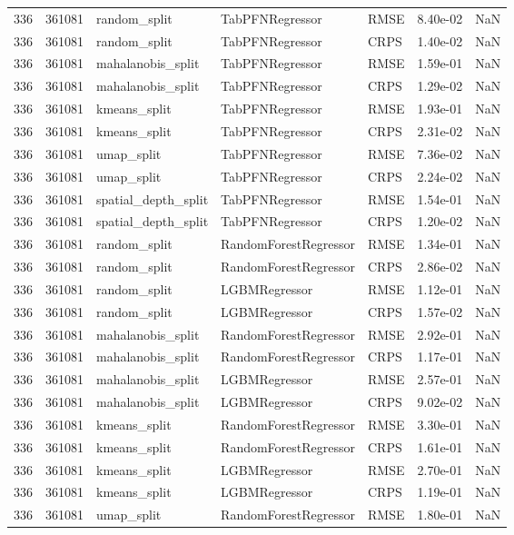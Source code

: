 \begin{tabular}{rrlllrr}
336 & 361081 & random\_split & TabPFNRegressor & RMSE & 8.40e-02 & NaN \\
336 & 361081 & random\_split & TabPFNRegressor & CRPS & 1.40e-02 & NaN \\
336 & 361081 & mahalanobis\_split & TabPFNRegressor & RMSE & 1.59e-01 & NaN \\
336 & 361081 & mahalanobis\_split & TabPFNRegressor & CRPS & 1.29e-02 & NaN \\
336 & 361081 & kmeans\_split & TabPFNRegressor & RMSE & 1.93e-01 & NaN \\
336 & 361081 & kmeans\_split & TabPFNRegressor & CRPS & 2.31e-02 & NaN \\
336 & 361081 & umap\_split & TabPFNRegressor & RMSE & 7.36e-02 & NaN \\
336 & 361081 & umap\_split & TabPFNRegressor & CRPS & 2.24e-02 & NaN \\
336 & 361081 & spatial\_depth\_split & TabPFNRegressor & RMSE & 1.54e-01 & NaN \\
336 & 361081 & spatial\_depth\_split & TabPFNRegressor & CRPS & 1.20e-02 & NaN \\
336 & 361081 & random\_split & RandomForestRegressor & RMSE & 1.34e-01 & NaN \\
336 & 361081 & random\_split & RandomForestRegressor & CRPS & 2.86e-02 & NaN \\
336 & 361081 & random\_split & LGBMRegressor & RMSE & 1.12e-01 & NaN \\
336 & 361081 & random\_split & LGBMRegressor & CRPS & 1.57e-02 & NaN \\
336 & 361081 & mahalanobis\_split & RandomForestRegressor & RMSE & 2.92e-01 & NaN \\
336 & 361081 & mahalanobis\_split & RandomForestRegressor & CRPS & 1.17e-01 & NaN \\
336 & 361081 & mahalanobis\_split & LGBMRegressor & RMSE & 2.57e-01 & NaN \\
336 & 361081 & mahalanobis\_split & LGBMRegressor & CRPS & 9.02e-02 & NaN \\
336 & 361081 & kmeans\_split & RandomForestRegressor & RMSE & 3.30e-01 & NaN \\
336 & 361081 & kmeans\_split & RandomForestRegressor & CRPS & 1.61e-01 & NaN \\
336 & 361081 & kmeans\_split & LGBMRegressor & RMSE & 2.70e-01 & NaN \\
336 & 361081 & kmeans\_split & LGBMRegressor & CRPS & 1.19e-01 & NaN \\
336 & 361081 & umap\_split & RandomForestRegressor & RMSE & 1.80e-01 & NaN \\

\end{tabular}
